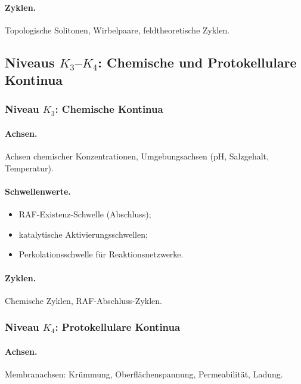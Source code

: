 \paragraph{Zyklen.}
Topologische Solitonen, Wirbelpaare, feldtheoretische Zyklen.

\subsection{Niveaus \texorpdfstring{\texorpdfstring{$K_3$}{K\_3}–\texorpdfstring{$K_4$}{K\_4}}{K3–K4}: Chemische und Protokellulare Kontinua}

\subsubsection{Niveau \texorpdfstring{\(K_3\)}{K3}: Chemische Kontinua}

\paragraph{Achsen.}
Achsen chemischer Konzentrationen, Umgebungsachsen (pH, Salzgehalt, Temperatur).

\paragraph{Schwellenwerte.}
\begin{itemize}
    \item RAF-Existenz-Schwelle (Abschluss);
    \item katalytische Aktivierungsschwellen;
    \item Perkolationsschwelle für Reaktionsnetzwerke.
\end{itemize}

\paragraph{Zyklen.}
Chemische Zyklen, RAF-Abschluss-Zyklen.

\subsubsection{Niveau \texorpdfstring{\(K_4\)}{K4}: Protokellulare Kontinua}

\paragraph{Achsen.}
Membranachsen: Krümmung, Oberflächenspannung, Permeabilität, Ladung.

